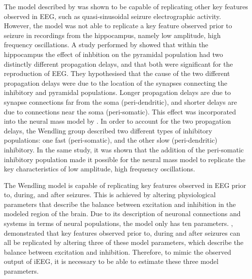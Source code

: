 The model described by \cite{jansen1995electroencephalogram} was shown to be capable of replicating other key features observed in EEG, such as quasi-sinusoidal seizure electrographic activity. However, the model was not able to replicate a key feature observed prior to seizure in recordings from the hippocampus, namely low amplitude, high frequency oscillations. A study performed by \cite{white2000networks} showed that within the hippocampus the effect of inhbition on the pyramidal population had two distinctly different propagation delays, and that both were significant for the reproduction of EEG. They hypothesised that the cause of the two different propagation delays were due to the location of the synapses connecting the inhibitory and pyramidal populations. Longer propagation delays are due to synapse connections far from the soma (peri-dendritic), and shorter delays are due to connections near the soma (peri-somatic).  This effect was incorporated into the neural mass model by \cite{wendling2002epileptic}. In order to account for the two propagation delays, the Wendling group described two different types of inhibitory populations: one fast (peri-somatic), and the other slow (peri-dendritic) inhibitory. In the same study, it was shown that the addition of the peri-somatic inhibitory population made it possible for the neural mass model to replicate the key characteristics of low amplitude, high frequency oscillations.


The Wendling model is capable of replicating key features observed in EEG prior to, during, and after seizures. This is achieved by altering physiological parameters that describe the balance between excitation and inhibition in the modeled region of the brain. Due to its description of neuronal connections and systems in terms of neural populations, the model only has ten parameters. \cite{wendling2002epileptic}, demonstrated that key features observed prior to, during and after seizures can all be replicated by altering three of these model parameters, which describe the balance between excitation and inhibition. Therefore, to mimic the observed output of iEEG, it is necessary to be able to estimate these three model parameters.

